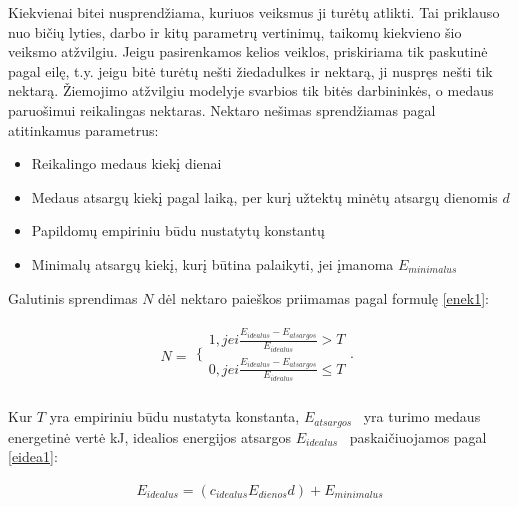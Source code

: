 \documentclass{VUMIFKompMagistrinis}
\begin{document}
Kiekvienai bitei nusprendžiama, kuriuos veiksmus ji turėtų atlikti. Tai priklauso nuo bičių lyties, darbo ir kitų parametrų vertinimų, taikomų kiekvieno šio veiksmo atžvilgiu. Jeigu pasirenkamos kelios veiklos, priskiriama tik paskutinė pagal eilę, t.y. jeigu bitė turėtų nešti žiedadulkes ir nektarą, ji nuspręs nešti tik nektarą. Žiemojimo atžvilgiu modelyje svarbios tik bitės darbininkės, o medaus paruošimui reikalingas nektaras. Nektaro nešimas sprendžiamas pagal atitinkamus parametrus:



\begin{itemize}
\item Reikalingo medaus kiek\k{i} dienai 
\item Medaus atsarg\k{u} kiek\k{i} pagal laik\k{a}, per kur\k{i} u\v{z}tekt\k{u} min\.et\k{u} atsarg\k{u} dienomis  $d$
\item Papildom\k{u} empiriniu b\=udu nustatyt\k{u} konstant\k{u}
\item Minimal\k{u} atsarg\k{u} kiek\k{i}, kur\k{i} b\=utina palaikyti, jei \k{i}manoma  $E_{\mathit{minimalus}}$
\end{itemize}{}

Galutinis sprendimas $N$ dėl nektaro paie\v{s}kos priimamas pagal formul\k{e} \eqref{enek1}:

\begin{equation}
\label{enek1}
N =
\begin{matrix}\{\begin{matrix}1,\mathit{jei}\frac{E_{\mathit{idealus}}-E_{\mathit{atsargos}}}{E_{\mathit{idealus}}}>T\\0,\mathit{jei}\frac{E_{\mathit{idealus}}-E_{\mathit{atsargos}}}{E_{\mathit{idealus}}}{\leq}T\end{matrix}.\\\end{matrix}
\end{equation}

Kur $T$ yra empiriniu būdu nustatyta konstanta,  $E_{\mathit{atsargos}}$ \ yra turimo medaus energetin\.e vert\.e kJ, idealios energijos atsargos  $E_{\mathit{idealus}}$ \ paskai\v{c}iuojamos pagal \eqref{eidea1}:

\begin{equation}
\label{eidea1}
\begin{matrix}E_{\mathit{idealus}}=(c_{\mathit{idealus}}E_{\mathit{dienos}}d)+E_{\mathit{minimalus}}\\\end{matrix}
\end{equation}
\end{document}
